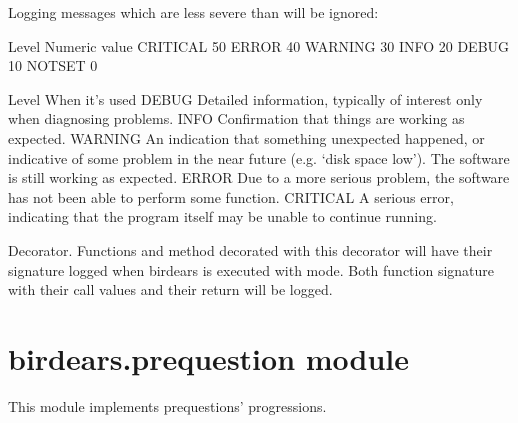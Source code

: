 \documentclass[letterpaper,10pt,english]{sphinxmanual}
\begin{document}
\sphinxAtStartPar
Logging messages which are less severe than  will be ignored:

\begin{sphinxVerbatim}[commandchars=\\\{\}]
Level       Numeric value
\PYGZhy{}\PYGZhy{}\PYGZhy{}\PYGZhy{}\PYGZhy{}       \PYGZhy{}\PYGZhy{}\PYGZhy{}\PYGZhy{}\PYGZhy{}\PYGZhy{}\PYGZhy{}\PYGZhy{}\PYGZhy{}\PYGZhy{}\PYGZhy{}\PYGZhy{}\PYGZhy{}
CRITICAL    50
ERROR       40
WARNING     30
INFO        20
DEBUG       10
NOTSET      0

Level       When it’s used
\PYGZhy{}\PYGZhy{}\PYGZhy{}\PYGZhy{}\PYGZhy{}       \PYGZhy{}\PYGZhy{}\PYGZhy{}\PYGZhy{}\PYGZhy{}\PYGZhy{}\PYGZhy{}\PYGZhy{}\PYGZhy{}\PYGZhy{}\PYGZhy{}\PYGZhy{}\PYGZhy{}\PYGZhy{}
DEBUG       Detailed information, typically of interest only when
                diagnosing problems.
INFO        Confirmation that things are working as expected.
WARNING     An indication that something unexpected happened, or indicative
                of some problem in the near future (e.g. ‘disk space low’).
                The software is still working as expected.
ERROR       Due to a more serious problem, the software has not been able
                to perform some function.
CRITICAL    A serious error, indicating that the program itself may be
                unable to continue running.
\end{sphinxVerbatim}

\begin{fulllineitems}
\label{\detokenize{birdears:birdears.logger.log_event}}
\sphinxAtStartPar
Decorator. Functions and method decorated with this decorator will have
their signature logged when birdears is executed with  mode. Both
function signature with their call values and their return will be logged.

\end{fulllineitems}



\section{birdears.prequestion module}
\label{\detokenize{birdears:module-birdears.prequestion}}\label{\detokenize{birdears:birdears-prequestion-module}}
\sphinxAtStartPar
This module implements pre\sphinxhyphen{}questions’ progressions.
\end{document}
